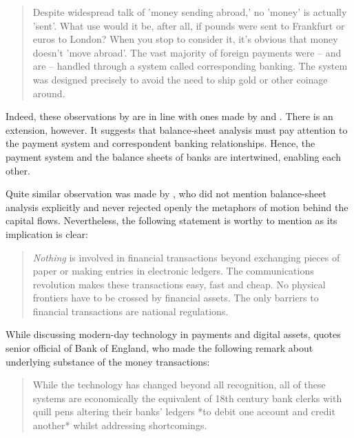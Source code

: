 \begin{quote} 
Despite widespread talk of 'money sending abroad,' no 'money' is actually 'sent'. What use would it be, after all, if pounds were sent to Frankfurt or euros to London? When you stop to consider it, it's obvious that money doesn't 'move abroad'. The vast majority of foreign payments were -- and are -- handled through a system called corresponding banking. The system was designed precisely to avoid the need to ship gold or other coinage around. \citep[p.~166]{payoff2021}
\end{quote}

Indeed, these observations by \citeauthor{payoff2021} are in line with ones made by \cite{woodruff2005} and \cite{mosler2010,mosler2022,mosler2023}. There is an extension, however. It suggests that balance-sheet analysis must pay attention to the payment system and correspondent banking relationships. Hence, the payment system and the balance sheets of banks are intertwined, enabling each other.

Quite similar observation was made by \citeauthor{tobin2000}, who did not mention balance-sheet analysis explicitly and never rejected openly the metaphors of motion behind the capital flows.
Nevertheless, the following statement is worthy to mention as its implication is clear:

\begin{quote}
\textit{Nothing} is involved in financial transactions beyond exchanging pieces of paper or making entries in electronic ledgers. The communications revolution makes these transactions easy, fast and cheap. No physical frontiers have to be crossed by financial assets. The only barriers to financial transactions are national regulations. \citep[p.~1101, emphasis added]{tobin2000}
\end{quote}

While discussing modern-day technology in payments and digital assets, \cite{payoff2021} quotes senior official of Bank of England, who made the following remark about underlying substance of the money transactions:

\begin{quote}
While the technology has changed beyond all recognition, all of these systems are economically the equivalent of 18th century bank clerks with quill pens altering their banks' ledgers *to debit one account and credit another* whilst addressing shortcomings. \citep[p.~9, emphasis added]{boe2020}
\end{quote}

